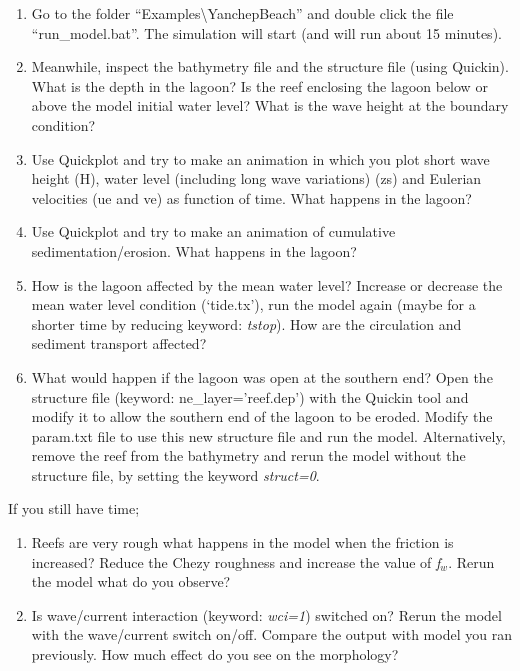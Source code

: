 \documentclass{article}
\begin{document}
\begin{enumerate}
\item \textbf{ }Go to the folder ``Examples\textbackslash YanchepBeach'' and double click the file ``run\_model.bat''. The simulation will start (and will run about 15 minutes).

\item  Meanwhile, inspect the bathymetry file and the structure file (using Quickin). What is the depth in the lagoon? Is the reef enclosing the lagoon below or above the model initial water level? What is the wave height at the boundary condition?

\item  Use  Quickplot and try to make an animation in which you plot short wave height (H), water level (including long wave variations) (zs) and Eulerian velocities (ue and ve) as function of time. What happens in the lagoon?

\item  Use  Quickplot and try to make an animation of cumulative sedimentation/erosion. What happens in the lagoon?

\item  How is the lagoon affected by the mean water level? Increase or decrease the mean water level condition (`tide.tx'), run the model again (maybe for a shorter time by reducing keyword: \textit{tstop}). How are the circulation and sediment transport affected?

\item  What would happen if the lagoon was open at the southern end? Open the structure file (keyword: ne\_layer='reef.dep') with the Quickin tool and modify it to allow the southern end of the lagoon to be eroded. Modify the param.txt file to use this new structure file and run the model. Alternatively, remove the reef from the bathymetry and rerun the model without the structure file, by setting the keyword \textit{struct=0}.
\end{enumerate}

\noindent 

\noindent If you still have time;

\begin{enumerate}
\item  Reefs are very rough what happens in the model when the friction is increased? Reduce the Chezy roughness and increase the value of \textit{f${}_{w}$}. Rerun the model what do you observe?

\item  Is wave/current interaction (keyword: \textit{wci=1}) switched on? Rerun the model with the wave/current switch on/off. Compare the output with model you ran previously. How much effect do you see on the morphology?
\end{enumerate}
\end{document}
